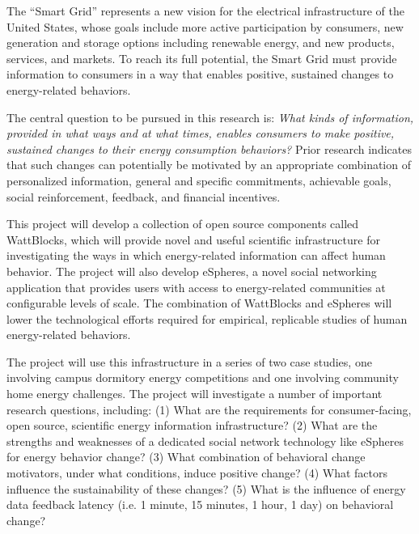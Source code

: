 

  The ``Smart Grid'' represents a new vision for
the electrical infrastructure of the United States, whose goals include
more active participation by consumers, new generation and storage options
including renewable energy, and new products, services, and markets.  To
reach its full potential, the Smart Grid must provide information to
consumers in a way that enables positive, sustained changes to
energy-related behaviors.  

The central question to be pursued in this research is: {\em What kinds of
  information, provided in what ways and at what times, enables consumers
  to make positive, sustained changes to their energy consumption
  behaviors?}  Prior research indicates that such changes can potentially
be motivated by an appropriate combination of personalized information,
general and specific commitments, achievable goals, social reinforcement,
feedback, and financial incentives.

\medskip

 This project will develop a collection
of open source components called WattBlocks, which  will provide novel and
useful scientific infrastructure for investigating the ways in which
energy-related information can affect human behavior. The project will also
develop eSpheres, a novel social networking application that provides users
with access to energy-related communities at configurable levels of
scale. The combination of WattBlocks and eSpheres will lower the technological 
efforts required for empirical, replicable studies of human energy-related
behaviors.    

The project will use this infrastructure in a series of two case studies, one
involving campus dormitory energy competitions and one involving community
home energy challenges.  The project will investigate a number of
important research questions, including: (1) What are the requirements
for consumer-facing, open source, scientific energy information
infrastructure? (2) What are the strengths and weaknesses of a dedicated
social network technology like eSpheres for energy behavior change? (3)
What combination of behavioral change motivators, under what conditions,
induce positive change? (4) What factors influence the sustainability of
these changes? (5) What is the influence of energy data feedback latency
(i.e. 1 minute, 15 minutes, 1 hour, 1 day) on behavioral change? 

